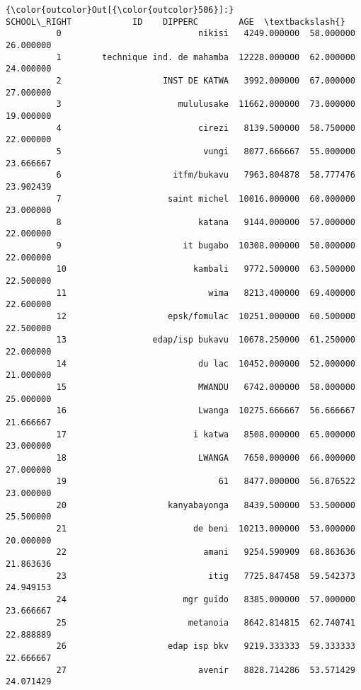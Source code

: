 \documentclass[11pt]{article}
\begin{document}
            \begin{Verbatim}[commandchars=\\\{\}]
{\color{outcolor}Out[{\color{outcolor}506}]:}                       SCHOOL\_RIGHT            ID    DIPPERC        AGE  \textbackslash{}
          0                           nikisi   4249.000000  58.000000  26.000000   
          1        technique ind. de mahamba  12228.000000  62.000000  24.000000   
          2                    INST DE KATWA   3992.000000  67.000000  27.000000   
          3                       mululusake  11662.000000  73.000000  19.000000   
          4                           cirezi   8139.500000  58.750000  22.000000   
          5                            vungi   8077.666667  55.000000  23.666667   
          6                      itfm/bukavu   7963.804878  58.777476  23.902439   
          7                     saint michel  10016.000000  60.000000  23.000000   
          8                           katana   9144.000000  57.000000  22.000000   
          9                        it bugabo  10308.000000  50.000000  22.000000   
          10                         kambali   9772.500000  63.500000  22.500000   
          11                            wima   8213.400000  69.400000  22.600000   
          12                    epsk/fomulac  10251.000000  60.500000  22.500000   
          13                 edap/isp bukavu  10678.250000  61.250000  22.000000   
          14                          du lac  10452.000000  52.000000  21.000000   
          15                          MWANDU   6742.000000  58.000000  25.000000   
          16                          Lwanga  10275.666667  56.666667  21.666667   
          17                         i katwa   8508.000000  65.000000  23.000000   
          18                          LWANGA   7650.000000  66.000000  27.000000   
          19                              61   8477.000000  56.876522  23.000000   
          20                    kanyabayonga   8439.500000  53.500000  25.500000   
          21                         de beni  10213.000000  53.000000  20.000000   
          22                           amani   9254.590909  68.863636  21.863636   
          23                            itig   7725.847458  59.542373  24.949153   
          24                       mgr guido   8385.000000  57.000000  23.666667   
          25                        metanoia   8642.814815  62.740741  22.888889   
          26                    edap isp bkv   9219.333333  59.333333  22.666667   
          27                          avenir   8828.714286  53.571429  24.071429   

\end{Verbatim}
\end{document}

